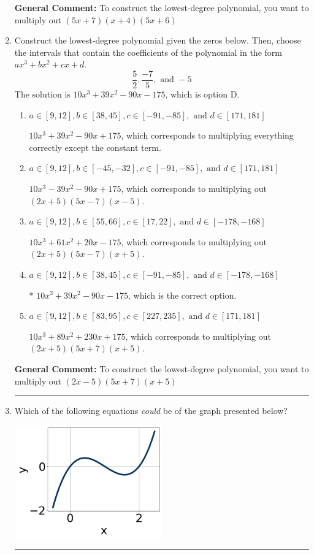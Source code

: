 \documentclass{extbook}[14pt]
\newcommand{\litem}[1]{\item #1

\rule{\textwidth}{0.4pt}}
\begin{document}
\begin{enumerate}
{\textbf{General Comment:} To construct the lowest-degree polynomial, you want to multiply out $(5x + 7)(x + 4)(5x + 6)$
}
\litem{
Construct the lowest-degree polynomial given the zeros below. Then, choose the intervals that contain the coefficients of the polynomial in the form $ax^3+bx^2+cx+d$.
\[ \frac{5}{2}, \frac{-7}{5}, \text{ and } -5 \]The solution is \( 10x^{3} +39 x^{2} -90 x -175 \), which is option D.\begin{enumerate}[label=\Alph*.]
\item \( a \in [9, 12], b \in [38, 45], c \in [-91, -85], \text{ and } d \in [171, 181] \)

$10x^{3} +39 x^{2} -90 x + 175$, which corresponds to multiplying everything correctly except the constant term.
\item \( a \in [9, 12], b \in [-45, -32], c \in [-91, -85], \text{ and } d \in [171, 181] \)

$10x^{3} -39 x^{2} -90 x + 175$, which corresponds to multiplying out $(2x + 5)(5x -7)(x -5)$.
\item \( a \in [9, 12], b \in [55, 66], c \in [17, 22], \text{ and } d \in [-178, -168] \)

$10x^{3} +61 x^{2} +20 x -175$, which corresponds to multiplying out $(2x + 5)(5x -7)(x + 5)$.
\item \( a \in [9, 12], b \in [38, 45], c \in [-91, -85], \text{ and } d \in [-178, -168] \)

* $10x^{3} +39 x^{2} -90 x -175$, which is the correct option.
\item \( a \in [9, 12], b \in [83, 95], c \in [227, 235], \text{ and } d \in [171, 181] \)

$10x^{3} +89 x^{2} +230 x + 175$, which corresponds to multiplying out $(2x + 5)(5x + 7)(x + 5)$.
\end{enumerate}

\textbf{General Comment:} To construct the lowest-degree polynomial, you want to multiply out $(2x -5)(5x + 7)(x + 5)$
}
\litem{
Which of the following equations \textit{could} be of the graph presented below?

\begin{center}
    \includegraphics[width=0.5\textwidth]{../Figures/polyGraphToFunctionCopyB.png}
\end{center}


}
\end{enumerate}
\end{document}

